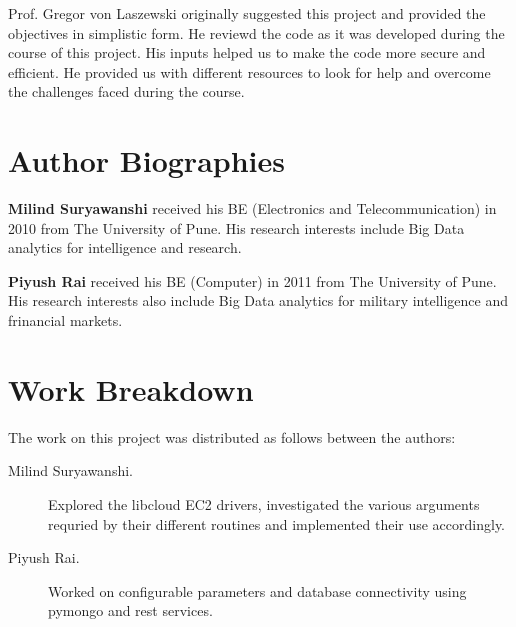 \documentclass[9pt,twocolumn,twoside]{../../styles/osajnl}
\begin{document}
Prof. Gregor von Laszewski originally suggested this project and provided the objectives in simplistic form. He reviewd the code as it was developed during the course of this project. His inputs helped us to make the code more secure and efficient. He provided us with different resources to look for help and overcome the challenges faced during the course.



 
\section*{Author Biographies}
\begingroup
\setlength\intextsep{0pt}
\begin{minipage}{1.0\columnwidth}
  \noindent
  {\bfseries Milind Suryawanshi} received his BE (Electronics and Telecommunication) in 2010 from
  The University of Pune. His research interests include Big Data analytics for intelligence and research. 
\end{minipage}
\begin{minipage}{1.0\columnwidth} 
  \noindent
  {\bfseries Piyush Rai} received his BE (Computer) in 2011 from
  The University of Pune. His research interests also include Big Data analytics for military intelligence and frinancial markets. 
\end{minipage}

\endgroup

\newpage

\appendix

\section{Work Breakdown}

The work on this project was distributed as follows between the
authors:

\begin{description}

\item[Milind Suryawanshi.] Explored the libcloud EC2 drivers, investigated the various arguments requried by their different routines and implemented their use accordingly.

\item[Piyush Rai.] Worked on configurable parameters and database connectivity using pymongo and rest services.

\end{description}
\end{document}
